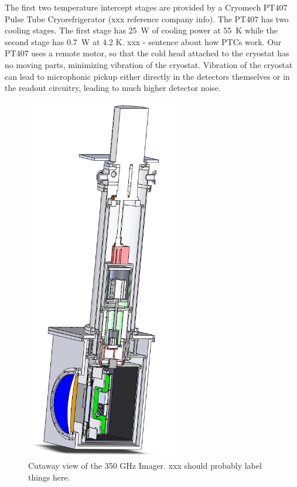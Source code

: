 \documentclass[12pt,article]{memoir} %
\begin{document}
The first two temperature intercept stages are provided by a Cryomech PT407 Pulse Tube Cryorefrigerator (xxx reference company info).
The PT407 has two cooling stages.
The first stage has 25~W of cooling power at 55~K while the second stage has 0.7~W at 4.2 K.
xxx - sentence about how PTCs work.
Our PT407 uses a remote motor, so that the cold head attached to the cryostat has no moving parts, minimizing vibration of the cryostat.
Vibration of the cryostat can lead to microphonic pickup either directly in the detectors themselves or in the readout circuitry, leading to much higher detector noise.


\begin{figure}[h]
\centering
\includegraphics[width=0.6\textwidth]{images/cryostat-cutaway.png}
\caption{Cutaway view of the 350 GHz Imager. xxx should probably label things here.}
\label{fig:cryo-cutaway}
\end{figure}
\end{document}
